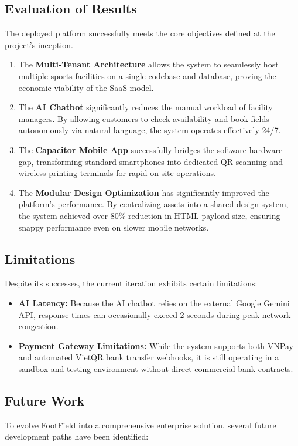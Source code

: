 \subsection{Evaluation of Results}
The deployed platform successfully meets the core objectives defined at the project's inception. 
\begin{enumerate}
    \item The \textbf{Multi-Tenant Architecture} allows the system to seamlessly host multiple sports facilities on a single codebase and database, proving the economic viability of the SaaS model.
    \item The \textbf{AI Chatbot} significantly reduces the manual workload of facility managers. By allowing customers to check availability and book fields autonomously via natural language, the system operates effectively 24/7.
    \item The \textbf{Capacitor Mobile App} successfully bridges the software-hardware gap, transforming standard smartphones into dedicated QR scanning and wireless printing terminals for rapid on-site operations.
    \item The \textbf{Modular Design Optimization} has significantly improved the platform's performance. By centralizing assets into a shared design system, the system achieved over 80\% reduction in HTML payload size, ensuring snappy performance even on slower mobile networks.
\end{enumerate}

\subsection{Limitations}
Despite its successes, the current iteration exhibits certain limitations:
\begin{itemize}
    \item \textbf{AI Latency:} Because the AI chatbot relies on the external Google Gemini API, response times can occasionally exceed 2 seconds during peak network congestion.
    \item \textbf{Payment Gateway Limitations:} While the system supports both VNPay and automated VietQR bank transfer webhooks, it is still operating in a sandbox and testing environment without direct commercial bank contracts.
\end{itemize}

\subsection{Future Work}
To evolve FootField into a comprehensive enterprise solution, several future development paths have been identified:

